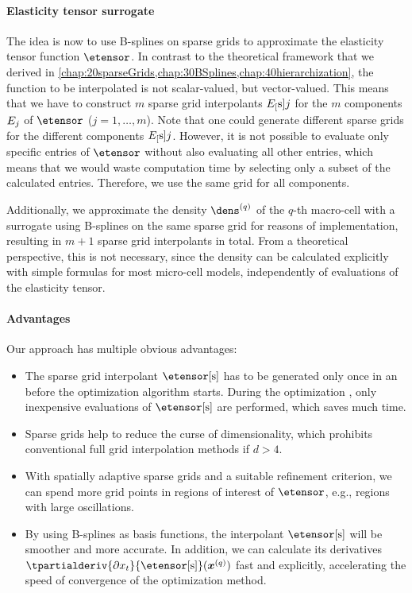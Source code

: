 \paragraph{Elasticity tensor surrogate}

The idea is now to use B-splines on sparse grids to approximate
the elasticity tensor function $\etensor$.
In contrast to the theoretical framework that we derived in
\cref{chap:20sparseGrids,chap:30BSplines,chap:40hierarchization},
the function to be interpolated is not scalar-valued, but vector-valued.
This means that we have to construct $m$ sparse grid interpolants
$E_{[}\mathrm{s}]{j}$
for the $m$ components $E_{j}$ of $\etensor$ ($j = 1, \dotsc, m$).
Note that one could generate different sparse grids for the
different components $E_{[}\mathrm{s}]{j}$.
However, it is not possible to evaluate only specific entries of $\etensor$
without also evaluating all other entries,
which means that we would waste computation time by selecting only
a subset of the calculated entries.
Therefore, we use the same grid for all components.

Additionally, we approximate the density $\dens^{(q)}$
of the $q$-th macro-cell with a surrogate using
B-splines on the same sparse grid for reasons of implementation,
resulting in $m + 1$ sparse grid interpolants in total.
From a theoretical perspective, this is not necessary,
since the density can be calculated explicitly with simple formulas
for most micro-cell models, independently of evaluations of the
elasticity tensor.

\paragraph{Advantages}

Our approach has multiple obvious advantages:
\begin{itemize}
  \item
  The sparse grid interpolant $\etensor[\sparse]$ has to be generated only
  once in an  before the optimization algorithm starts.
  During the optimization ,
  only inexpensive evaluations of $\etensor[\sparse]$ are performed,
  which saves much time.
  
  \item
  Sparse grids help to reduce the curse of dimensionality, which prohibits
  conventional full grid interpolation methods if $d > 4$.
  
  \item
  With spatially adaptive sparse grids and a suitable refinement criterion,
  we can spend more grid points in regions of interest of $\etensor$,
  e.g., regions with large oscillations.
  
  \item
  By using B-splines as basis functions,
  the interpolant $\etensor[\sparse]$ will be smoother and more accurate.
  In addition, we can calculate its derivatives
  $\tpartialderiv{\partialdiff{} x_t}{\etensor[\sparse]}(\*x^{(q)})$
  fast and explicitly,
  accelerating the speed of convergence of the optimization method.
\end{itemize}



